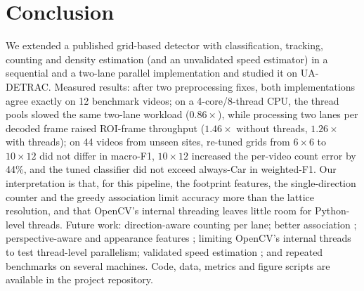 \section{Conclusion}
\label{sec:conclusion}
We extended a published grid-based detector with classification,
tracking, counting and density estimation (and an unvalidated speed
estimator) in a sequential and a two-lane parallel implementation and
studied it on UA-DETRAC. Measured results: after two preprocessing fixes,
both implementations agree exactly on 12 benchmark videos; on a
4-core/8-thread CPU, the thread pools slowed the same two-lane workload
($0.86\times$), while processing two lanes per decoded frame raised
ROI-frame throughput ($1.46\times$ without threads, $1.26\times$ with
threads); on 44 videos from unseen sites, re-tuned grids from $6{\times}6$
to $10{\times}12$ did not differ in macro-F1, $10{\times}12$ increased the
per-video count error by 44\%, and the tuned classifier did not exceed
always-Car in weighted-F1. Our interpretation is that, for this pipeline,
the footprint features, the single-direction counter and the greedy
association limit accuracy more than the lattice resolution, and that
OpenCV's internal threading leaves little room for Python-level threads.
Future work: direction-aware counting per lane; better association
\cite{bewley2016,wojke2017}; perspective-aware and appearance features
\cite{chang2025,macko2025}; limiting OpenCV's internal threads to test
thread-level parallelism; validated speed estimation \cite{kamil2024};
and repeated benchmarks on several machines. Code, data, metrics and
figure scripts are available in the project repository.


